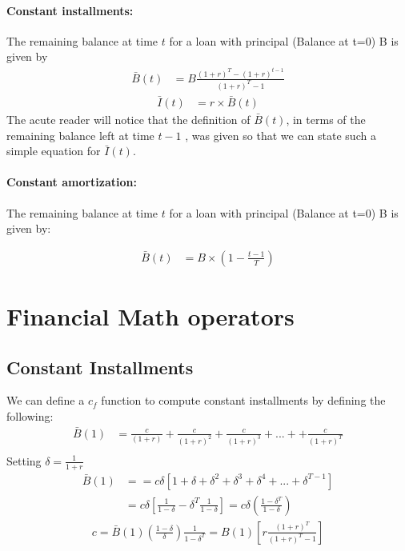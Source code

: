 \paragraph{Constant installments:} The remaining balance at time $t$ for a loan with principal (Balance at t=0) B is given by 
\begin{align}
\bar{ B}(t)&=B\frac{(1+r)^T-(1+r)^{t-1}}{(1+r)^T-1}
\end{align}
\begin{align}
\bar{ I}(t)&=r\times \bar{ B}(t)
\end{align}
The acute reader will notice that the definition of $\bar{B}(t)$, in terms of the remaining balance left at time $t-1$ , was given so that we can state such a simple equation for $\bar{I}(t)$.


\paragraph{Constant amortization: } The remaining balance at time $t$ for a loan with principal (Balance at t=0) B is given by:

\begin{align}
\bar{B}(t)&=B \times (1-\frac{t-1}{T})
\end{align}



\section{Financial Math operators}
\subsection{Constant Installments}
We can define a $c_f$ function to compute constant installments by defining the following:
\begin{align}
    \bar{B}(1) &= \frac{c}{(1+r)}+\frac{c}{(1+r)^2}+\frac{c}{(1+r)^3}+...++\frac{c}{(1+r)^T} \nonumber\\
\end{align}
Setting $\delta=\frac{1}{1+r}$
\begin{align}
    \bar{B}(1) &==c\delta[1+\delta+\delta^2+\delta^3+\delta^4+...+\delta^{T-1}] \nonumber \\
    &=c\delta\left[\frac{1}{1-\delta}-\delta^T\frac{1}{1-\delta}\right] =c\delta\left(\frac{1-\delta^T}{1-\delta}\right)
\end{align}
\begin{align}
    c=\bar{B}(1)\left(\frac{1-\delta}{\delta}\right)\frac{1}{1-\delta^T}=B(1)\left[r\frac{(1+r)^T}{(1+r)^T-1}\right]
\end{align}

